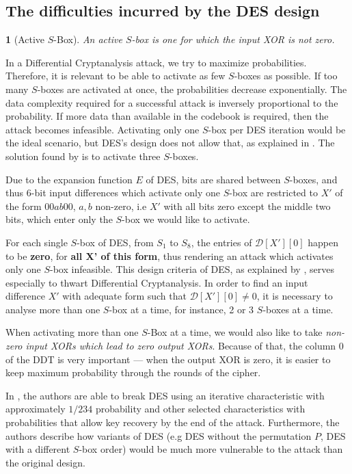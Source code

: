 \documentclass{report}
\newtheorem*{concept}{}{\bfseries}{\itshape}
\begin{document}
\subsection{The difficulties incurred by the DES design}\label{sec:des-difficulties}

\begin{concept}[Active $S$-Box]
An \emph{active} $S$-box is one for which the \emph{input XOR is not zero}.
\end{concept}

In a Differential Cryptanalysis attack, we try to maximize probabilities. Therefore, it is relevant to be able to activate as few $S$-boxes as possible. If too many $S$-boxes are activated at once, the probabilities decrease exponentially. The data complexity required for a successful attack is inversely proportional to the probability. If more data than available in the codebook is required, then the attack becomes infeasible. Activating only one $S$-box per DES iteration would be the ideal scenario, but DES's design does not allow that, as explained in \cite{Coppersmith1994}. The solution found by \cite{Shamir} is to activate three $S$-boxes.

Due to the expansion function $E$ of DES, bits are shared between $S$-boxes, and thus 6-bit input differences which activate only one $S$-box are restricted to $X'$ of the form $00ab00$, $a, b$ non-zero, i.e $X'$ with all bits zero except the middle two bits, which enter only the $S$-box we would like to activate.

For each single $S$-box of DES, from $S_1$ to $S_8$, the entries of $\mathcal{D}[X'][0]$ happen to be \textbf{zero}, for \textbf{all X' of this form}, thus rendering an attack which activates only one $S$-box infeasible. This design criteria of DES, as explained by \cite{Coppersmith1994}, serves especially to thwart Differential Cryptanalysis. In order to find an input difference $X'$ with adequate form such that $\mathcal{D}[X'][0] \neq 0$, it is necessary to analyse more than one $S$-box at a time, for instance, 2 or 3 $S$-boxes at a time.

When activating more than one $S$-Box at a time, we would also like to take \emph{non-zero input XORs which lead to zero output XORs}. Because of that, the column $0$ of the DDT is very important --- when the output XOR is zero, it is easier to keep maximum probability through the rounds of the cipher.

In \cite{Shamir}, the authors are able to break DES using an iterative characteristic with approximately $1/234$ probability and other selected characteristics with probabilities that allow key recovery by the end of the attack. Furthermore, the authors describe how variants of DES (e.g DES without the permutation $P$, DES with a different $S$-box order) would be much more vulnerable to the attack than the original design.
\end{document}
